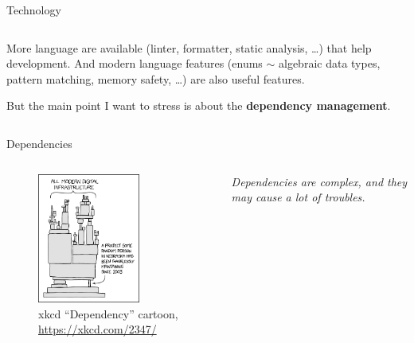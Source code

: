 \documentclass[9pt]{beamer}
\begin{document}
\begin{frame}{Technology}
\begin{columns}
\begin{column}{0.5\textwidth}
            \vspace*{15pt}
            More language are available (linter, formatter, static analysis,
            \dots) that help development.
            And modern language features (enums $\sim$ algebraic data types,
            pattern matching, memory safety, \dots) are also useful features.

            \vspace*{15pt}
            But the main point I want to stress is about the \textbf{dependency
            management}.
        \end{column}
    \end{columns}
\end{frame}

\begin{frame}{Dependencies}
    \begin{columns}
        \begin{column}{0.5\textwidth}
            \vspace*{20pt}
            \begin{figure}
                \centering
                \includegraphics[width=0.7\textwidth]{dependency}
                \caption{
                    xkcd \enquote{Dependency} cartoon,
                    \url{https://xkcd.com/2347/}
                }
            \end{figure}
        \end{column}
        \begin{column}{0.5\textwidth}
            \begin{center}
                \itshape
                Dependencies are complex, and they may cause a lot of troubles.
            \end{center}


\end{column}
\end{columns}
\end{frame}
\end{document}

